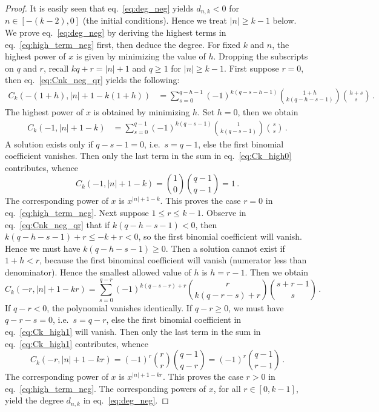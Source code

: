 \documentclass[review]{elsarticle}
\theoremstyle{plain}
\begin{document}
\begin{proof}
It is easily seen that eq.~\eqref{eq:deg_neg} yields $d_{n,k}<0$ for $n\in[-(k-2),0]$ (the initial conditions).
Hence we treat $|n|\ge k-1$ below.
We prove eq.~\eqref{eq:deg_neg} by deriving the highest terms in eq.~\eqref{eq:high_term_neg} first, then deduce the degree.  
For fixed $k$ and $n$, the highest power of $x$ is given by minimizing the value of $h$.
Dropping the subscripts on $q$ and $r$, recall $kq+r=|n|+1$ and $q\ge1$ for $|n|\ge k-1$.
First suppose $r=0$, then eq.~\eqref{eq:Cnk_neg_qr} yields the following:
\begin{equation}
\begin{split}
  C_k(-(1+h),|n|+1-k(1+h)) &= \sum_{s=0}^{q-h-1} (-1)^{k(q-s-h-1)} %
  \binom{1+h}{k(q-h-s-1)} \binom{h+s}{s} \,.
\end{split}
\end{equation}
The highest power of $x$ is obtained by minimizing $h$.
Set $h=0$, then we obtain 
\begin{equation}
\label{eq:Ck_high0}  
\begin{split}
C_k(-1,|n|+1-k) &= \sum_{s=0}^{q-1} (-1)^{k(q-s-1)} \binom{1}{k(q-s-1)} \binom{s}{s} \,.
\end{split}
\end{equation}
A solution exists only if $q-s-1=0$, i.e.~$s=q-1$, else the first binomial coefficient vanishes.
Then only the last term in the sum in eq.~\eqref{eq:Ck_high0} contributes, whence
\begin{equation}
C_k(-1,|n|+1-k) = \binom{1}{0} \binom{q-1}{q-1} = 1 \,.
\end{equation}
The corresponding power of $x$ is $x^{|n|+1-k}$.
This proves the case $r=0$ in eq.~\eqref{eq:high_term_neg}.
Next suppose $1 \le r \le k-1$.
Observe in eq.~\eqref{eq:Cnk_neg_qr} that if $k(q-h-s-1)<0$, then
$k(q-h-s-1)+r \le -k+r < 0$, so the first binomial coefficient will vanish.
Hence we must have $k(q-h-s-1)\ge0$.
Then a solution cannot exist if $1+h<r$, because the first binominal coefficient will vanish (numerator less than denominator).
Hence the smallest allowed value of $h$ is $h=r-1$.
Then we obtain %
\begin{equation}
\label{eq:Ck_high1}
C_k(-r,|n|+1-kr) = \sum_{s=0}^{q-r} (-1)^{k(q-s-r)+r} \binom{r}{k(q-r-s)+r} \binom{s+r-1}{s} \,.
\end{equation}
If $q-r<0$, the polynomial vanishes identically.
If $q-r\ge0$, we must have $q-r-s=0$, i.e.~$s=q-r$, else the first binomial coefficient in eq.~\eqref{eq:Ck_high1} will vanish.
Then only the last term in the sum in eq.~\eqref{eq:Ck_high1} contributes, whence
\begin{equation}
C_k(-r,|n|+1-kr) = (-1)^r \binom{r}{r} \binom{q-1}{q-r} = (-1)^r \binom{q-1}{r-1} \,.
\end{equation}
The corresponding power of $x$ is $x^{|n|+1-kr}$.
This proves the case $r>0$ in eq.~\eqref{eq:high_term_neg}.
The corresponding powers of $x$, for all $r\in[0,k-1]$, yield the degree $d_{n,k}$ in eq.~\eqref{eq:deg_neg}.
\end{proof}
\end{document}
